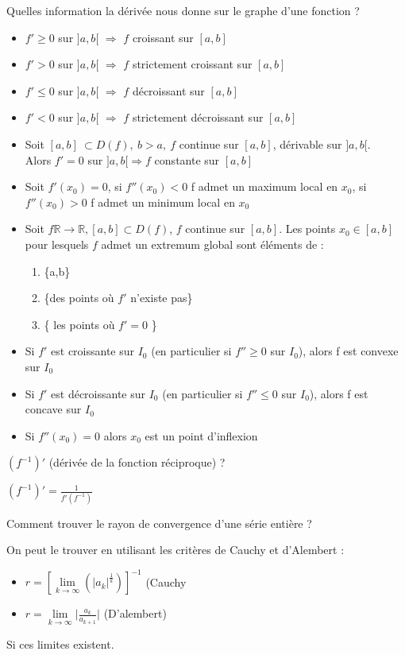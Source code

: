 \documentclass[12pt]{article}
\newcommand*{\xfield}[1]{\begin{mdframed}\centering #1\end{mdframed}\bigskip}
\newenvironment{note}{}{}
\begin{document}
\begin{note}
	\xfield{Quelles information la dérivée nous donne sur le graphe d'une fonction ?}
	\xfield{\begin{itemize}
		\item $f' \ge 0$ sur $]a,b[$ $\Rightarrow$ $f$ croissant sur $[a,b]$
		\item $f' > 0$ sur $]a,b[$ $\Rightarrow$ $f$ strictement croissant sur $[a,b]$
		\item $f' \le 0$ sur $]a,b[$ $\Rightarrow$ $f$ décroissant sur $[a,b]$
		\item $f' < 0$ sur $]a,b[$ $\Rightarrow$ $f$ strictement décroissant sur $[a,b]$
		\item Soit $[a,b]\ \subset D(f),\ b > a,\ f$ continue sur $[a,b]$, dérivable sur $]a,b[$.\\
		Alors $f'=0$ sur $]a,b[ \Rightarrow f$ constante sur $[a,b]$
		\item Soit $f'(x_0)=0$, si $f''(x_0)<0$ f admet un maximum local en $x_0$,
		si $f''(x_0)>0$ f admet un minimum local en $x_0$
		\item Soit $f \mathbb{R} \to \mathbb{R}, [a,b] \subset D(f)$, $f$ continue sur $[a,b]$. Les points $x_0 \in [a,b]$ pour lesquels $f$ admet un extremum global sont éléments de : \begin{enumerate}
			\item \{a,b\}
			\item \{des points où $f'$ n'existe pas\}
			\item \{ les points où $f'=0$ \}
		\end{enumerate}
		\item Si $f'$ est croissante sur $I_0$ (en particulier si $f'' \ge 0$ sur $I_0$), alors f est convexe sur $I_0$
		\item Si $f'$ est décroissante sur $I_0$ (en particulier si $f'' \le 0$ sur $I_0$), alors f est concave sur $I_0$ 
		\item Si $f''(x_0) = 0$ alors $x_0$ est un point d'inflexion
	\end{itemize} }
\end{note}

\begin{note}
	\xfield{$(f^{-1})'$ (dérivée de la fonction réciproque) ?}
	\xfield{$(f^{-1})' =  \frac{1}{f'(f^{-1})}$}
\end{note}

\begin{note}
	\xfield{Comment trouver le rayon de convergence d'une série entière ?}
	\xfield{On peut le trouver en utilisant les critères de Cauchy et d'Alembert :\begin{itemize}
	\item $r = \left[ \lim\limits_{k \to \infty} (\vert a_k \vert^{\frac{1}{k}})\right]^{-1}$ (Cauchy
	\item $r=  \lim\limits_{k \to \infty} \big| \frac{a_k}{a_{k+1}}\big|$ (D'alembert)
	\end{itemize}
	 Si ces limites existent.}
\end{note}
\end{document}

